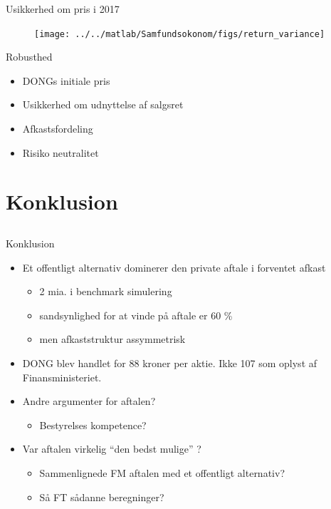 \documentclass{beamer}
\begin{document}
\begin{frame}{ Usikkerhed om pris i 2017}

\begin{figure}
\texttt{[image: ../../matlab/Samfundsokonom/figs/return\_variance]}
\label{fig:usikkerhed}
\end{figure}
	
\end{frame}

\begin{frame}{Robusthed}

\begin{itemize}
	\item DONGs initiale pris
	\item Usikkerhed om udnyttelse af salgsret
	\item Afkastsfordeling
	\item Risiko neutralitet
\end{itemize}

\end{frame}

\section{Konklusion}
\subsection{}

\begin{frame}{Konklusion}
\begin{itemize}
	\item Et offentligt alternativ dominerer den private aftale i forventet afkast
	\pause
	\begin{itemize}
	\item 2 mia. i benchmark simulering
	\pause 
	\item sandsynlighed for at vinde på aftale er 60 \%
	\pause 
	\item men afkaststruktur assymmetrisk
	\end{itemize}
	\pause
	\item DONG blev handlet for 88 kroner per aktie. Ikke 107 som oplyst af Finansministeriet.
	\pause 
	\item Andre argumenter for aftalen?
	\begin{itemize}
	\item Bestyrelses kompetence?
	\end{itemize}
	\pause
	\item Var aftalen virkelig \enquote{den bedst mulige} ?
	\begin{itemize}
	\item Sammenlignede FM aftalen med et offentligt alternativ?
	\item Så FT sådanne beregninger?
	\end{itemize}
\end{itemize}

\end{frame}
\end{document}
